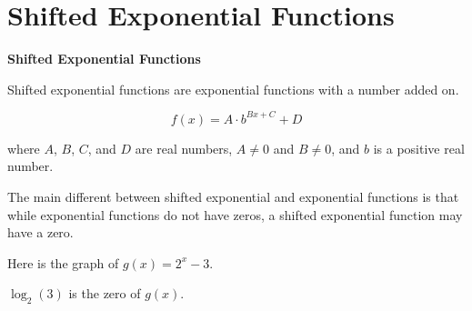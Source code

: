 \documentclass{ximera}
\begin{document}
\section*{Shifted Exponential Functions}


\begin{definition} \textbf{\textcolor{green!50!black}{Shifted Exponential Functions}}

Shifted exponential functions are exponential functions with a number added on.


\[      f(x) = A \cdot b^{B x + C} + D   \]

where $A$, $B$, $C$, and $D$ are real numbers, $A \ne 0$ and $B \ne 0$, and $b$ is a positive real number.


\end{definition}




The main different between shifted exponential and exponential functions is that while exponential functions do not have zeros, a shifted exponential function may have a zero. \\







\begin{example}

Here is the graph of $g(x) = 2^x - 3$.

\begin{image}
\end{image}


$\log_2(3)$ is the zero of $g(x)$.



\end{example}
\end{document}
